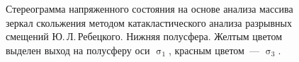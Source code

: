 \begin{figure}[H]
\begin{changemargin}{0cm}{0cm}
\begin{center}
\begin{minipage}[h]{0.34\linewidth}
        \caption{Стереограмма напряженного состояния на основе
    анализа массива зеркал скольжения методом катакластического анализа разрывных смещений Ю.\,Л.\,Ребецкого.
    Нижняя полусфера. Желтым цветом выделен выход на полусферу оси $\upsigma_1$, красным цветом~--- $\upsigma_3$.}
        \label{fig:kondratev-fig3}
    \end{minipage}


  \end{center}
\end{changemargin}

\end{figure}
